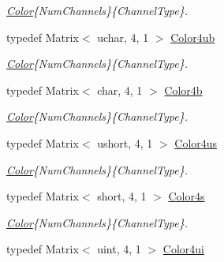 \begin{DoxyCompactItemize}
\begin{DoxyCompactList}\small\item\em \hyperlink{class_d_o_1_1_color}{Color}\{Num\-Channels\}\{Channel\-Type\}. \end{DoxyCompactList}\item 
\hypertarget{group___color_types_ga546db612644ff4dcb8989ae595ec64f9}{typedef Matrix$<$ uchar, 4, 1 $>$ \hyperlink{group___color_types_ga546db612644ff4dcb8989ae595ec64f9}{Color4ub}}\label{group___color_types_ga546db612644ff4dcb8989ae595ec64f9}

\begin{DoxyCompactList}\small\item\em \hyperlink{class_d_o_1_1_color}{Color}\{Num\-Channels\}\{Channel\-Type\}. \end{DoxyCompactList}\item 
\hypertarget{group___color_types_gae7984ff08c9ba758ce5f27fdc8331fe1}{typedef Matrix$<$ char, 4, 1 $>$ \hyperlink{group___color_types_gae7984ff08c9ba758ce5f27fdc8331fe1}{Color4b}}\label{group___color_types_gae7984ff08c9ba758ce5f27fdc8331fe1}

\begin{DoxyCompactList}\small\item\em \hyperlink{class_d_o_1_1_color}{Color}\{Num\-Channels\}\{Channel\-Type\}. \end{DoxyCompactList}\item 
\hypertarget{group___color_types_ga02b3291301a6935cf5e61982e0bad148}{typedef Matrix$<$ ushort, 4, 1 $>$ \hyperlink{group___color_types_ga02b3291301a6935cf5e61982e0bad148}{Color4us}}\label{group___color_types_ga02b3291301a6935cf5e61982e0bad148}

\begin{DoxyCompactList}\small\item\em \hyperlink{class_d_o_1_1_color}{Color}\{Num\-Channels\}\{Channel\-Type\}. \end{DoxyCompactList}\item 
\hypertarget{group___color_types_ga295a200e7f116771de96186c8378b2c0}{typedef Matrix$<$ short, 4, 1 $>$ \hyperlink{group___color_types_ga295a200e7f116771de96186c8378b2c0}{Color4s}}\label{group___color_types_ga295a200e7f116771de96186c8378b2c0}

\begin{DoxyCompactList}\small\item\em \hyperlink{class_d_o_1_1_color}{Color}\{Num\-Channels\}\{Channel\-Type\}. \end{DoxyCompactList}\item 
\hypertarget{group___color_types_ga06ec7b40cf1ff351eee8d233a9b49001}{typedef Matrix$<$ uint, 4, 1 $>$ \hyperlink{group___color_types_ga06ec7b40cf1ff351eee8d233a9b49001}{Color4ui}}\label{group___color_types_ga06ec7b40cf1ff351eee8d233a9b49001}


\end{DoxyCompactItemize}
